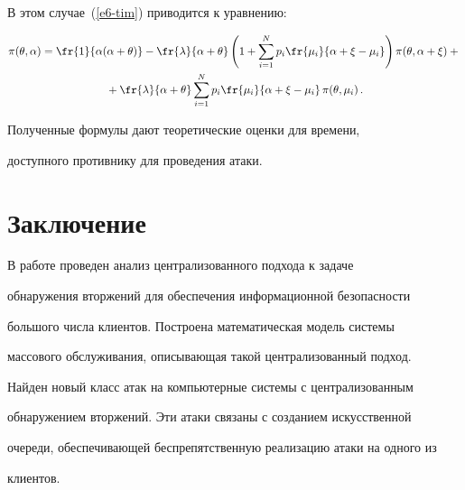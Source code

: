 В этом случае~(\ref{e6-tim}) приводится к уравнению:

\begin{multline*}

\pi(\theta,\alpha) =\fr{1}{\alpha(\alpha+\theta)} -\fr{\lambda}{\alpha+\theta} 

\left( 1+\sum\limits_{i=1}^N p_i \fr{\mu_i}{\alpha +\xi - \mu_i} \right) \pi(\theta, 

\alpha+\xi) +{}\\

{}+ \fr{\lambda}{\alpha+\theta} \sum\limits_{i=1}^N p_i\fr{\mu_i}{\alpha+\xi -

\mu_i}\,\pi(\theta,\mu_i)\,.

\end{multline*}

    

    Полученные формулы дают теоретические оценки для времени, 

доступного противнику для проведения атаки.

    

\section{Заключение}

    

    В работе проведен анализ централизованного подхода к задаче 

обнаружения вторжений для обеспечения информационной безопасности 

большого числа клиентов. Построена математическая модель системы 

массового обслуживания, описывающая такой централизованный подход. 

Найден новый класс атак на компьютерные системы с централизованным 

обнаружением вторжений. Эти атаки связаны с созданием искусственной 

очереди, обеспечивающей беспрепятственную реализацию атаки на одного из 

клиентов.

   

   

